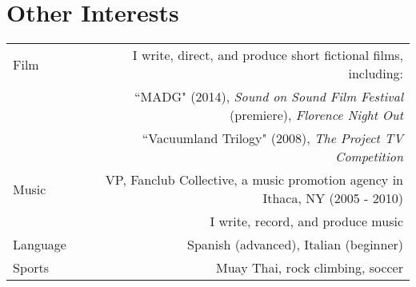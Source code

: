 \section*{Other Interests}
\begin{tabular}{L!{\VRule}R}
Film & I write, direct, and produce short fictional films, including: \\
& ``MADG" (2014), {\it Sound on Sound Film Festival} (premiere), {\it Florence Night Out} \\
& ``Vacuumland Trilogy" (2008), {\it The Project TV Competition} \\
Music & VP, Fanclub Collective, a music promotion agency in Ithaca, NY (2005 - 2010)\\
& I write, record, and produce music \\
Language & Spanish (advanced), Italian (beginner) \\
Sports & Muay Thai, rock climbing, soccer
\end{tabular}
